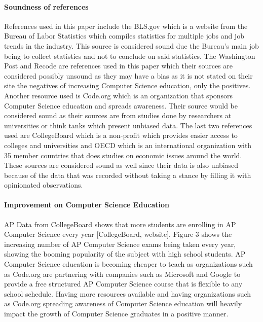 \documentclass[12pt, letterpaper]{report}
\begin{document}
\paragraph*{Soundness of references \\}
References used in this paper include the BLS.gov which is a website from the Bureau of Labor Statistics which compiles statistics for multiple jobs and job trends in the industry. This source is considered sound due the Bureau's main job being to collect statistics and not to conclude on said statistics. The Washington Post and Recode are references used in this paper which their sources are considered possibly unsound as they may have a bias as it is not stated on their site the negatives of increasing Computer Science education, only the positives. Another resource used is Code.org which is an organization that sponsors Computer Science education and spreads awareness. Their source would be considered sound as their sources are from studies done by researchers at universities or think tanks which present unbiased data. The last two references used are CollegeBoard which is a non-profit which provides easier access to colleges and universities and OECD which is an international organization with 35 member countries that does studies on economic issues around the world. These sources are considered sound as well since their data is also unbiased because of the data that was recorded without taking a stance by filling it with opinionated observations. 

\paragraph*{Improvement on Computer Science Education \\}
AP Data from CollegeBoard shows that more students are enrolling in AP Computer Science every year [CollegeBoard, website]. Figure 3 shows the increasing number of AP Computer Science exams being taken every year, showing the booming popularity of the subject with high school students. AP Computer Science education is becoming cheaper to teach as organizations such as Code.org are partnering with companies such as Microsoft and Google to provide a free structured AP Computer Science course that is flexible to any school schedule. Having more resources available and having organizations such as Code.org spreading awareness of Computer Science education will heavily impact the growth of Computer Science graduates in a positive manner.
\end{document}
